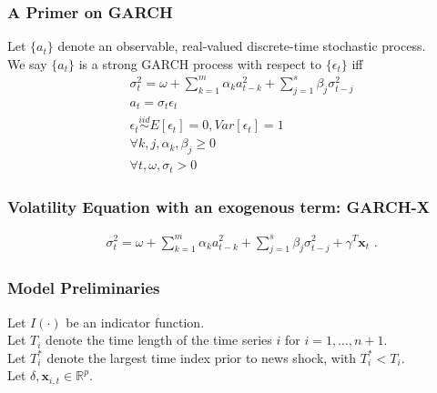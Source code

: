 \documentclass[9pt]{beamer}
\newcommand{\x}{\textbf{x}}
\newcommand{\simiid}{\stackrel{iid}{\sim}} %
\theoremstyle{definition}
\begin{document}
\begin{frame}
    \frametitle{A Primer on GARCH}

    Let $\{a_{t}\}$ denote an observable, real-valued discrete-time stochastic process.\\
    

    We say $\{a_{t}\}$ is a strong GARCH process with respect to $\{\epsilon_{t}\}$ iff 
    \begin{align*}
        &\sigma_{t}^{2} = \omega + \sum^{m}_{k=1}\alpha_{k}a^{2}_{t-k} + \sum_{j=1}^{s}\beta_{j}\sigma_{t-j}^{2}\\
        &a_{t} = \sigma_{t}\epsilon_{t}\\
        &\epsilon_{t} \simiid E[\epsilon_{t}]=0, Var[\epsilon_{t}] = 1\\
        &\forall k,j, \alpha_{k},\beta_{j}\geq 0\\ 
        &\forall t, \omega, \sigma_{t} > 0 
        \end{align*}
\end{frame}

\begin{frame}
    \frametitle{Volatility Equation with an exogenous term: GARCH-X}
    
    \begin{align*}
        &\sigma_{t}^{2} = \omega+ \sum^{m}_{k=1}\alpha_{k}a^{2}_{t-k} + \sum_{j=1}^{s}\beta_{j}\sigma_{t-j}^{2} + \gamma^{T}\x_{t} \text{ .}\label{GARCH-X}
    \end{align*}
    
    \end{frame}
    
\begin{frame}
    \frametitle{Model Preliminaries}

    \fontsize{8}{7.2}

    Let $I(\cdot)$ be an indicator function.  \\
\bigbreak
    Let $T_i$ denote the time length of the time series $i$ for $i = 1, \ldots, n+1$.\\
    \bigbreak
    Let $T_i^*$ denote the largest time index prior to news shock, with $T_i^* < T_i$. \\
    \bigbreak
    Let $\delta, \x_{i,t} \in \mathbb{R}^{p}$.  
\end{frame}
\end{document}
